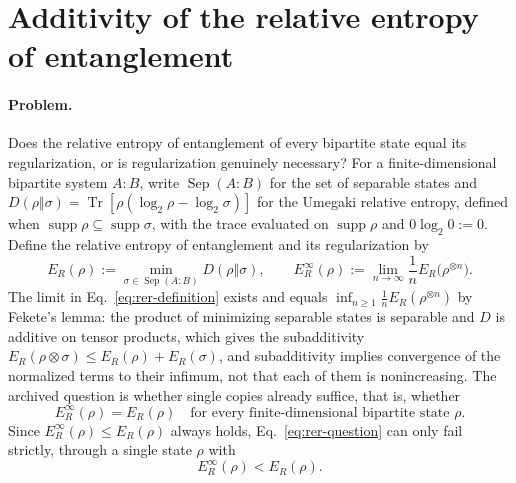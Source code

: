 \section{Additivity of the relative entropy of entanglement}
\label{sec:op_a381e2ccd80cec9c}

\paragraph{Problem.}
Does the relative entropy of entanglement of every bipartite state equal its
regularization, or is regularization genuinely necessary?  For a
finite-dimensional bipartite system $A{:}B$, write $\operatorname{Sep}(A{:}B)$
for the set of separable states and
$D(\rho\Vert\sigma)=\operatorname{Tr}[\rho(\log_2\rho-\log_2\sigma)]$ for the
Umegaki relative entropy, defined when
$\operatorname{supp}\rho\subseteq\operatorname{supp}\sigma$, with the trace
evaluated on $\operatorname{supp}\rho$ and $0\log_2 0:=0$.  Define the
relative entropy of entanglement and its regularization by
\begin{equation}
  E_R(\rho)
  :=\min_{\sigma\in\operatorname{Sep}(A{:}B)}D(\rho\Vert\sigma),
  \qquad
  E_R^\infty(\rho)
  :=\lim_{n\to\infty}\frac1nE_R\bigl(\rho^{\otimes n}\bigr).
  \label{eq:rer-definition}
\end{equation}
The limit in Eq.~\eqref{eq:rer-definition} exists and equals
$\inf_{n\geq1}\frac1nE_R(\rho^{\otimes n})$ by Fekete's lemma: the product
of minimizing separable states is separable and $D$ is additive on tensor
products, which gives the subadditivity
$E_R(\rho\otimes\sigma)\leq E_R(\rho)+E_R(\sigma)$, and subadditivity implies
convergence of the normalized terms to their infimum, not that each of them
is nonincreasing.  The archived question is
whether single copies already suffice, that is, whether
\begin{equation}
  E_R^\infty(\rho)=E_R(\rho)
  \quad\text{for every finite-dimensional bipartite state }\rho.
  \label{eq:rer-question}
\end{equation}
Since $E_R^\infty(\rho)\leq E_R(\rho)$ always holds,
Eq.~\eqref{eq:rer-question} can only fail strictly, through a single state
$\rho$ with
\begin{equation}
  E_R^\infty(\rho)<E_R(\rho).
  \label{eq:rer-failure}
\end{equation}

